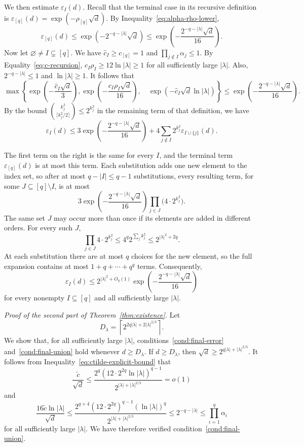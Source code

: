 \documentclass[12pt]{article}
\numberwithin{equation}{section}
\theoremstyle{definition}
\begin{document}
We then estimate $\varepsilon_I(d)$. Recall that the terminal case in its
recursive definition is
$\varepsilon_{[q]}(d)=\exp(-\rho_{[q]}\sqrt d)$. By
Inequality~\eqref{eq:alpha-rho-lower},
\[
 \varepsilon_{[q]}(d)
 \leq\exp(-2^{-q-|\lambda|}\sqrt d)
 \leq\exp\left(-\frac{2^{-q-|\lambda|}\sqrt d}{16}\right).
\]
Now let $\varnothing\ne I\subsetneq[q]$. We have $\hat c_I\geq c_{[q]}=1$ and
$\prod_{j\notin I}\alpha_j\leq1$. By Equality~\eqref{eq:c-recursion},
$c_I\rho_I\geq12\ln|\lambda|\geq1$ for all sufficiently large
$|\lambda|$. Also,
$2^{-q-|\lambda|}\leq1$ and $\ln|\lambda|\geq1$. It follows that
\[
 \max\left\{
 \exp\left(-\frac{\hat c_I\sqrt d}{3}\right),
 \exp\left(-\frac{c_I\rho_I\sqrt d}{16}\right),\quad
 \exp(-\hat c_I\sqrt d\ln|\lambda|)
 \right\}
 \leq\exp\left(-\frac{2^{-q-|\lambda|}\sqrt d}{16}\right).
\]
By the bound
$\binom{k_j^2}{\lceil k_j^2/2\rceil}\leq2^{k_j^2}$ in the remaining term of
that definition, we have
\[
 \varepsilon_I(d)
 \leq3\exp\left(-\frac{2^{-q-|\lambda|}\sqrt d}{16}\right)
 +4\sum_{j\notin I}2^{k_j^2}\varepsilon_{I\cup\{j\}}(d).
\]

The first term on the right is the same for every $I$, and the terminal term
$\varepsilon_{[q]}(d)$ is at most this term. Each substitution adds one new
element to the index set, so after at most $q-|I|\leq q-1$ substitutions,
every resulting term, for some $J\subseteq[q]\setminus I$, is at most
\[
 3\exp\left(-\frac{2^{-q-|\lambda|}\sqrt d}{16}\right)
 \prod_{j\in J}\bigl(4\cdot2^{k_j^2}\bigr).
\]
The same set $J$ may occur more than
once if its elements are added in different orders. For every such $J$,
\[
 \prod_{j\in J}4\cdot2^{k_j^2}
 \leq4^q2^{\sum_jk_j^2}
 \leq2^{|\lambda|^2+2q}.
\]
At each substitution there are at most $q$ choices for the new element, so
the full expansion contains at most $1+q+\cdots+q^q$ terms. Consequently,
\begin{equation}\label{eq:error-asymptotic-bound}
 \varepsilon_I(d)
 \leq2^{|\lambda|^2+O_q(1)}
 \exp\left(-\frac{2^{-q-|\lambda|}\sqrt d}{16}\right)
\end{equation}
for every nonempty $I\subseteq[q]$ and all sufficiently large $|\lambda|$.

\medskip
\noindent
\emph{Proof of the second part of Theorem~\ref{thm:existence}.}
Let
\[
 D_\lambda=\left\lceil
 2^{2q|\lambda|+2|\lambda|^{2/3}}
 \right\rceil.
\]
We show that, for all sufficiently large $|\lambda|$,
conditions~\ref{cond:final-error} and~\ref{cond:final-union}
hold whenever $d\geq D_\lambda$.
If $d\geq D_\lambda$, then
$\sqrt d\geq2^{q|\lambda|+|\lambda|^{2/3}}$.
It follows from Inequality~\eqref{eq:ctilde-explicit-bound} that
\[
 \frac{\widetilde c}{\sqrt d}
 \leq
 \frac{2^q(12\cdot 2^{2q}\ln|\lambda|)^{q-1}}
 {2^{|\lambda|+|\lambda|^{2/3}}}
 =o(1)
\]
and
\[
 \frac{16\widetilde c\ln|\lambda|}{\sqrt d}
 \leq
 \frac{2^{q+4}(12\cdot 2^{2q})^{q-1}(\ln|\lambda|)^q}
 {2^{|\lambda|+|\lambda|^{2/3}}}
 \leq2^{-q-|\lambda|}
 \leq\prod_{i=1}^q\alpha_i
\]
for all sufficiently large $|\lambda|$. We have therefore verified
condition~\ref{cond:final-union}.
\end{document}
